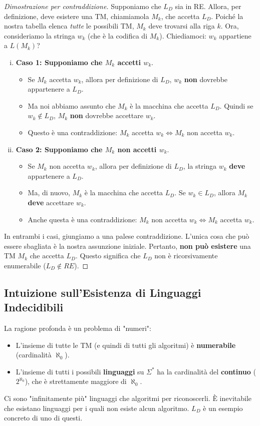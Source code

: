 \documentclass[a4paper]{article}
\theoremstyle{remark} %
\begin{document}
\begin{proof}[Dimostrazione per contraddizione]
Supponiamo che $L_D$ sia in RE. Allora, per definizione, deve esistere una TM, chiamiamola $M_k$, che accetta $L_D$. Poiché la nostra tabella elenca \textit{tutte} le possibili TM, $M_k$ deve trovarsi alla riga $k$.
Ora, consideriamo la stringa $w_k$ (che è la codifica di $M_k$). Chiediamoci: $w_k$ appartiene a $L(M_k)$?

\begin{enumerate}[(i)]
    \item \textbf{Caso 1: Supponiamo che $M_k$ accetti $w_k$}.
    \begin{itemize}
        \item Se $M_k$ accetta $w_k$, allora per definizione di $L_D$, $w_k$ \textbf{non} dovrebbe appartenere a $L_D$.
        \item Ma noi abbiamo assunto che $M_k$ è la macchina che accetta $L_D$. Quindi se $w_k \notin L_D$, $M_k$ \textbf{non} dovrebbe accettare $w_k$.
        \item Questo è una contraddizione: $M_k$ accetta $w_k \iff M_k$ non accetta $w_k$.
    \end{itemize}

    \item \textbf{Caso 2: Supponiamo che $M_k$ non accetti $w_k$}.
    \begin{itemize}
        \item Se $M_k$ non accetta $w_k$, allora per definizione di $L_D$, la stringa $w_k$ \textbf{deve} appartenere a $L_D$.
        \item Ma, di nuovo, $M_k$ è la macchina che accetta $L_D$. Se $w_k \in L_D$, allora $M_k$ \textbf{deve} accettare $w_k$.
        \item Anche questa è una contraddizione: $M_k$ non accetta $w_k \iff M_k$ accetta $w_k$.
    \end{itemize}
\end{enumerate}
In entrambi i casi, giungiamo a una palese contraddizione. L'unica cosa che può essere sbagliata è la nostra assunzione iniziale. Pertanto, \textbf{non può esistere} una TM $M_k$ che accetta $L_D$. Questo significa che $L_D$ non è ricorsivamente enumerabile ($L_D \notin RE$).
\end{proof}

\subsection{Intuizione sull'Esistenza di Linguaggi Indecidibili}
La ragione profonda è un problema di "numeri":
\begin{itemize}
    \item L'insieme di tutte le TM (e quindi di tutti gli algoritmi) è \textbf{numerabile} (cardinalità $\aleph_0$).
    \item L'insieme di tutti i possibili \textbf{linguaggi} su $\Sigma^*$ ha la cardinalità del \textbf{continuo} ($2^{\aleph_0}$), che è strettamente maggiore di $\aleph_0$.
\end{itemize}
Ci sono "infinitamente più" linguaggi che algoritmi per riconoscerli. È inevitabile che esistano linguaggi per i quali non esiste alcun algoritmo. $L_D$ è un esempio concreto di uno di questi.
\end{document}
